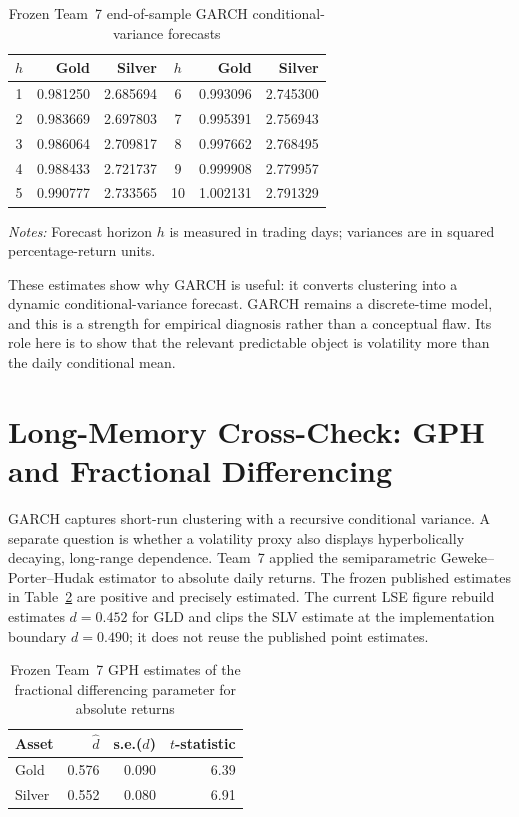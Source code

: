 \begin{table}[htbp]
\centering
\caption{Frozen Team~7 end-of-sample GARCH conditional-variance forecasts}
\label{tab:t7-garch-forecasts}
\small
\begin{tabular}{crr@{\qquad}crr}
\toprule
$h$ & Gold & Silver & $h$ & Gold & Silver \\
\midrule
1 & 0.981250 & 2.685694 &  6 & 0.993096 & 2.745300 \\
2 & 0.983669 & 2.697803 &  7 & 0.995391 & 2.756943 \\
3 & 0.986064 & 2.709817 &  8 & 0.997662 & 2.768495 \\
4 & 0.988433 & 2.721737 &  9 & 0.999908 & 2.779957 \\
5 & 0.990777 & 2.733565 & 10 & 1.002131 & 2.791329 \\
\bottomrule
\end{tabular}
\begin{minipage}{0.90\textwidth}
\footnotesize\emph{Notes:} Forecast horizon $h$ is measured in trading days;
variances are in squared percentage-return units.
\end{minipage}
\end{table}

These estimates show why GARCH is useful: it converts clustering into a
dynamic conditional-variance forecast. GARCH remains a discrete-time model,
and this is a strength for empirical diagnosis rather than a conceptual flaw.
Its role here is to show that the relevant predictable object is volatility
more than the daily conditional mean.

\section{Long-Memory Cross-Check: GPH and Fractional Differencing}

GARCH captures short-run clustering with a recursive conditional variance. A
separate question is whether a volatility proxy also displays hyperbolically
decaying, long-range dependence. Team~7 applied the semiparametric
Geweke--Porter--Hudak estimator to absolute daily returns. The frozen published
estimates in Table~\ref{tab:t7-gph} are positive and precisely estimated. The
current LSE figure rebuild estimates $d=0.452$ for GLD and clips the SLV
estimate at the implementation boundary $d=0.490$; it does not reuse the
published point estimates.

\begin{table}[htbp]
\centering
\caption{Frozen Team~7 GPH estimates of the fractional differencing parameter for absolute returns}
\label{tab:t7-gph}
\small
\begin{tabular}{lrrr}
\toprule
Asset & $\hat d$ & s.e.($\hat d$) & $t$-statistic \\
\midrule
Gold   & 0.576 & 0.090 & 6.39 \\
Silver & 0.552 & 0.080 & 6.91 \\
\bottomrule
\end{tabular}
\end{table}

